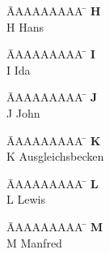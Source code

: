 \documentclass[a4paper, fleqn, headsepline, footsepline, 12pt, parskip=half]{scrartcl}
\begin{document}
\vspace*{-1.5cm}
\begin{tabbing}
	\hspace{0.0cm}  \= AAAAAAAAA \=       \hspace{2cm} \kill
	\>\textbf{H} 	\> \\
	\>H 			\>  Hans\\
\end{tabbing} 

\vspace*{-1.5cm}
\begin{tabbing}
	\hspace{0.0cm}  \= AAAAAAAAA \=       \hspace{2cm} \kill
	\>\textbf{I} 	\> \\
	\>I 			\>  Ida\\
\end{tabbing} 

\vspace*{-1.5cm}
\begin{tabbing}
	\hspace{0.0cm}  \= AAAAAAAAA \=       \hspace{2cm} \kill
	\>\textbf{J} 	\> \\
	\>J 			\>  John\\
\end{tabbing}

\vspace*{-1.5cm}
\begin{tabbing}
	\hspace{0.0cm}  \= AAAAAAAAA \=       \hspace{2cm} \kill
	\>\textbf{K} 	\> \\
	\>K 			\>  Ausgleichsbecken\\
\end{tabbing}

\vspace*{-1.5cm}
\begin{tabbing}
	\hspace{0.0cm}  \= AAAAAAAAA \=       \hspace{2cm} \kill
	\>\textbf{L} 	\> \\
	\>L 			\>  Lewis\\
\end{tabbing}

\vspace*{-1.5cm}
\begin{tabbing}
	\hspace{0.0cm}  \= AAAAAAAAA \=       \hspace{2cm} \kill
	\>\textbf{M} 	\> \\
	\>M 			\>  Manfred\\
\end{tabbing} 
\end{document}
